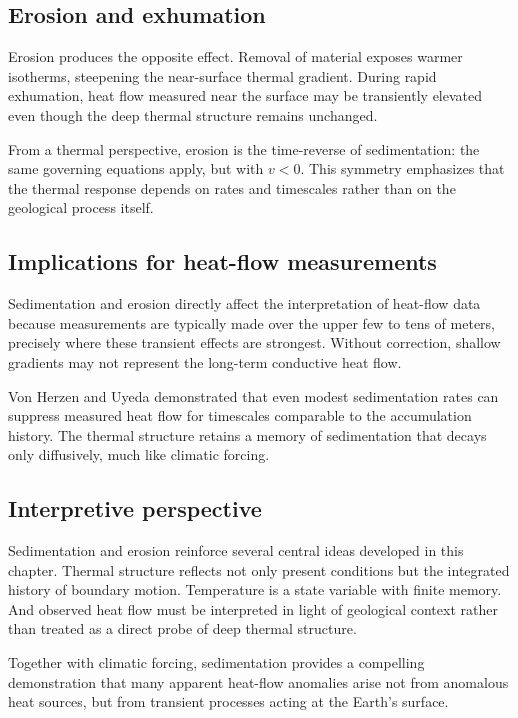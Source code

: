 \subsection{Erosion and exhumation}

Erosion produces the opposite effect. Removal of material exposes warmer isotherms, steepening the near-surface thermal gradient. During rapid exhumation, heat flow measured near the surface may be transiently elevated even though the deep thermal structure remains unchanged.

From a thermal perspective, erosion is the time-reverse of sedimentation: the same governing equations apply, but with $v < 0$. This symmetry emphasizes that the thermal response depends on rates and timescales rather than on the geological process itself.

\subsection{Implications for heat-flow measurements}

Sedimentation and erosion directly affect the interpretation of heat-flow data because measurements are typically made over the upper few to tens of meters, precisely where these transient effects are strongest. Without correction, shallow gradients may not represent the long-term conductive heat flow.

Von Herzen and Uyeda demonstrated that even modest sedimentation rates can suppress measured heat flow for timescales comparable to the accumulation history. The thermal structure retains a memory of sedimentation that decays only diffusively, much like climatic forcing.

\subsection{Interpretive perspective}

Sedimentation and erosion reinforce several central ideas developed in this chapter.  Thermal structure reflects not only present conditions but the integrated history of boundary motion. Temperature is a state variable with finite memory. And observed heat flow must be interpreted in light of geological context rather than treated as a direct probe of deep thermal structure.

Together with climatic forcing, sedimentation provides a compelling demonstration that many apparent heat-flow anomalies arise not from anomalous heat sources, but from transient processes acting at the Earth's surface.

